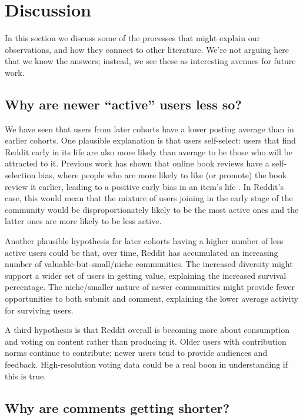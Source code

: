 
\section{Discussion}

In this section we discuss some of the processes that might explain our observations, and how they connect to other literature.  We're not arguing here that we know the answers; instead, we see these as interesting avenues for future work.  

\subsection{Why are newer ``active'' users less so?}

We have seen that users from later cohorts have a lower posting average than in earlier cohorts. 
One plausible explanation is that users self-select: users that find Reddit early in its life are also more likely than average to be those who will be attracted to it. Previous work has shown that online book reviews have a self-selection bias, where people who are more likely to like (or promote) the book review it earlier, leading to a positive early bias in an item's life \cite{Li2008}.  In Reddit's case, this would mean that the mixture of users joining in the early stage of the community would be disproportionately likely to be the most active ones and the latter ones are more likely to be less active. 

Another plausible hypothesis for later cohorts having a higher number of less active users could be that, over time, Reddit has accumulated an increasing number of valuable-but-small/niche communities.  The increased diversity might support a wider set of users in getting value, explaining the increased survival percentage.  The niche/smaller nature of newer communities might provide fewer opportunities to both submit and comment, explaining the lower average activity for surviving users. 

A third hypothesis is that Reddit overall is becoming more about consumption and voting on content rather than producing it.  Older users with contribution norms continue to contribute; newer users tend to provide audiences and feedback.  High-resolution voting data could be a real boon in understanding if this is true.

\subsection{Why are comments getting shorter?}

